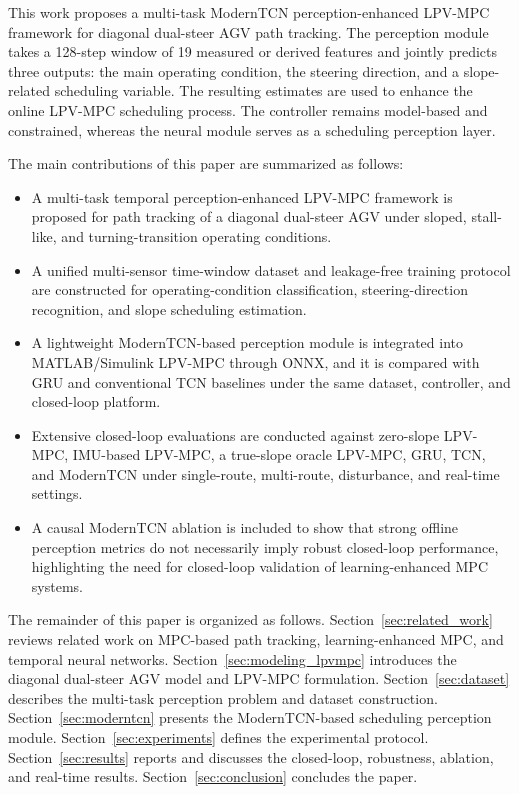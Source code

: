 \documentclass[twocolumn]{article}
\begin{document}
This work proposes a multi-task ModernTCN perception-enhanced LPV-MPC framework for diagonal dual-steer AGV path tracking. The perception module takes a 128-step window of 19 measured or derived features and jointly predicts three outputs: the main operating condition, the steering direction, and a slope-related scheduling variable. The resulting estimates are used to enhance the online LPV-MPC scheduling process. The controller remains model-based and constrained, whereas the neural module serves as a scheduling perception layer.

The main contributions of this paper are summarized as follows:

\begin{itemize}

\item A multi-task temporal perception-enhanced LPV-MPC framework is proposed for path tracking of a diagonal dual-steer AGV under sloped, stall-like, and turning-transition operating conditions.

\item A unified multi-sensor time-window dataset and leakage-free training protocol are constructed for operating-condition classification, steering-direction recognition, and slope scheduling estimation.

\item A lightweight ModernTCN-based perception module is integrated into MATLAB/Simulink LPV-MPC through ONNX, and it is compared with GRU and conventional TCN baselines under the same dataset, controller, and closed-loop platform.

\item Extensive closed-loop evaluations are conducted against zero-slope LPV-MPC, IMU-based LPV-MPC, a true-slope oracle LPV-MPC, GRU, TCN, and ModernTCN under single-route, multi-route, disturbance, and real-time settings.

\item A causal ModernTCN ablation is included to show that strong offline perception metrics do not necessarily imply robust closed-loop performance, highlighting the need for closed-loop validation of learning-enhanced MPC systems.

\end{itemize}

The remainder of this paper is organized as follows. Section~\ref{sec:related_work} reviews related work on MPC-based path tracking, learning-enhanced MPC, and temporal neural networks. Section~\ref{sec:modeling_lpvmpc} introduces the diagonal dual-steer AGV model and LPV-MPC formulation. Section~\ref{sec:dataset} describes the multi-task perception problem and dataset construction. Section~\ref{sec:moderntcn} presents the ModernTCN-based scheduling perception module. Section~\ref{sec:experiments} defines the experimental protocol. Section~\ref{sec:results} reports and discusses the closed-loop, robustness, ablation, and real-time results. Section~\ref{sec:conclusion} concludes the paper.
\end{document}
